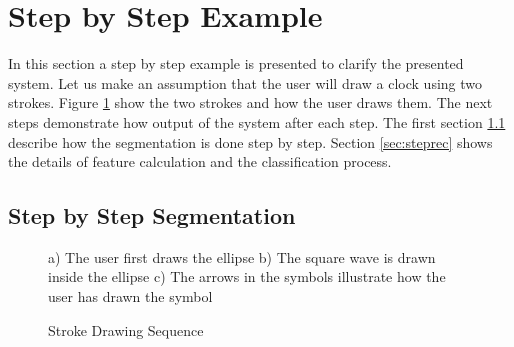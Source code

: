 

\section{Step by Step Example}
\label{secstepExample}
In this section a step by step example is presented to clarify the presented system. Let us make an assumption that the user will draw a clock using two strokes. Figure \ref{fig:clock} show the two strokes and how the user draws them. The next steps demonstrate how output of the system after each step. The first section \ref{sec:stepseg} describe how the segmentation is done step by step. Section \ref{sec:steprec} shows the details of feature calculation and the classification process. 

\subsection{Step by Step Segmentation}
\label{sec:stepseg}


\begin{figure}
	\centering
		
		
	\caption{Stroke Drawing Sequence} a) The user first draws the ellipse b) The square wave is drawn inside the ellipse c) The arrows in the symbols illustrate how the user has drawn the symbol
	\label{fig:clock}
\end{figure}

